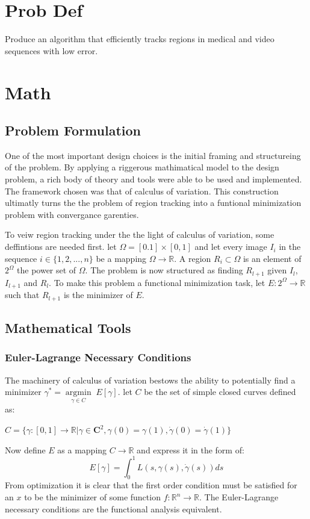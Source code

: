 \documentclass{article}
\newcommand{\R}{\mathds{R}}
\newcommand{\argmin}[1]{\underset{#1}{\operatorname{argmin}}\;}
\begin{document}
	\section{Prob Def}
		Produce an algorithm that efficiently tracks regions in medical and video sequences with low error.

	\section{Math}
		\subsection{Problem Formulation}
			One of the most important design choices is the initial framing and structureing of the problem. By applying a riggerous mathimatical model to the design problem, a rich body of theory and tools were able to be used and implemented. The framework chosen was that of calculus of variation. This construction ultimatly turns the the problem of region tracking into a funtional minimization problem with convergance garenties. 

			To veiw region tracking under the the light of calculus of variation, some deffintions are needed first. let $\Omega = [0.1] \times [0,1]$ and let every image $I_i$ in the sequence $i\in \{1, 2, ... ,n\}$ be a mapping $\Omega \rightarrow \mathds{R}$. A region $R_i \subset \Omega$ is an element of $2^\Omega$ the power set of $\Omega$. The problem is now structured as finding $R_{l+1}$ given $I_l$, $I_{l+1}$ and $R_l$. To make this problem a functional minimization task, let $E:2^\Omega \rightarrow \mathds{R}$ such that $R_{l+1}$ is the minimizer of $E$.

			\subsection{Mathematical Tools}
				\subsubsection{Euler-Lagrange Necessary Conditions}
					The machinery of calculus of variation bestows the ability to potentially find a minimizer $\gamma^* = \argmin{\gamma \in C}E[\gamma]$. let $C$ be the set of simple closed curves defined as:
					\begin{center}
						$C = \{\gamma: [0,1]\rightarrow\R | \gamma \in \textbf{C}^2, \gamma(0)=\gamma(1),\dot\gamma(0)=\dot\gamma(1)\}$
					\end{center}
					Now define $E$ as a mapping $C\rightarrow\R$ and express it in the form of:
					\begin{equation} \label{eq:einlaform}
						E[\gamma] = \int_0^1{L(s,\gamma(s),\dot\gamma(s))ds}
					\end{equation}
					From optimization it is clear that the first order condition must be satisfied for an $x$ to be the minimizer of some function $f:\R^n\rightarrow\R$. The Euler-Lagrange necessary conditions are the functional analysis equivalent.
\end{document}
